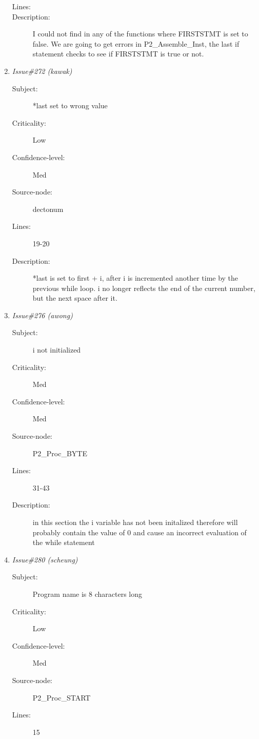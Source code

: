 \begin{enumerate}
\begin{description}
\item [Lines:] 

\item [Description:] I could not find in any of the functions where
FIRSTSTMT is set to false.  We are going to get errors in P2\_Assemble\_Inst,
the last if statement checks to see if FIRSTSTMT is true or not.
\end{description}
\item {\it Issue\#272 (kawak)}
\begin{description}
\item [Subject:] *last set to wrong value
\item [Criticality:] Low
\item [Confidence-level:] Med
\item [Source-node:] dectonum

\item [Lines:] 19-20

\item [Description:] *last is set to first + i, after i is incremented another time by the
previous while loop.  i no longer reflects the end of the current number, but
the next space after it.
\end{description}
\item {\it Issue\#276 (awong)}
\begin{description}
\item [Subject:] i not initialized
\item [Criticality:] Med
\item [Confidence-level:] Med
\item [Source-node:] P2\_Proc\_BYTE

\item [Lines:] 31-43

\item [Description:] in this section the i variable has not been
initalized therefore will probably contain the value of 0 and cause an
incorrect evaluation of the while statement
\end{description}
\item {\it Issue\#280 (scheung)}
\begin{description}
\item [Subject:] Program name is 8 characters long
\item [Criticality:] Low
\item [Confidence-level:] Med
\item [Source-node:] P2\_Proc\_START

\item [Lines:] 15


\end{description}
\end{enumerate}
